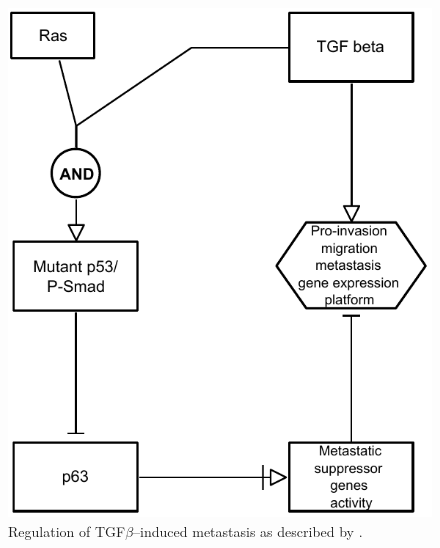 \begin{figure}[!ht]
  \centering
  \includegraphics[scale=0.69]{figures/af_example.pdf}
\caption{Regulation of TGF$\beta$--induced metastasis as described by \citet{Adorno2009}.}
  \label{fig:af_example}
\end{figure}
